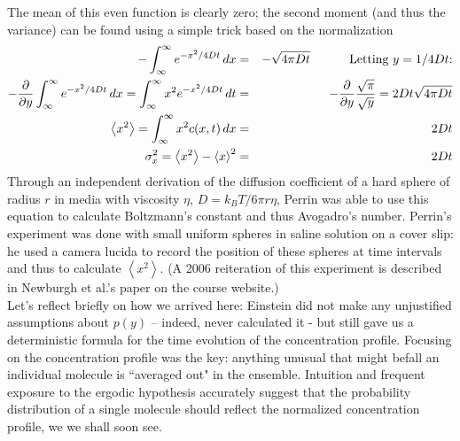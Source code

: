 \documentclass{article}
\begin{document}
The mean of this even function is clearly zero; the second moment (and thus the variance) can be found using a simple trick based on the normalization 
\begin{eqnarray*}
- \int_{\infty}^{\infty} e^{-x^2/4Dt} \, dx & = & - \sqrt{4\pi D t} \hspace{1 cm} \textrm{ Letting $y=1/4 D t$:}\\
- \frac{\partial}{\partial y} \int_{\infty}^{\infty} e^{-x^2/4Dt} \, dx =
\int_{\infty}^{\infty} x^2 e^{-x^2/4Dt} \, dt & = & - \frac{\partial}{\partial y} \frac{\sqrt{\pi}}{\sqrt{y}} = 2 D t \sqrt{4 \pi D t}\\
\left< x^2 \right> = \int_{\infty}^{\infty} x^2 c(x,t) \, dx  & = & 2 D t\\
\sigma_x^2 = \left< x^2 \right>  - \left< x \right>^2 & = & 2Dt
\end{eqnarray*}
Through an independent derivation of the diffusion coefficient of a hard sphere of radius $r$ in media with viscosity $\eta$, $D=k_B T / 6\pi r \eta$, Perrin was able to use this equation to calculate Boltzmann's constant and thus Avogadro's number. Perrin's experiment was done with small uniform spheres in saline solution on a cover slip: he used a camera lucida to record the position of these spheres at time intervals and thus to calculate $\left< x^2 \right>$. (A 2006 reiteration of this experiment is described in Newburgh et al.'s paper on the course website.)\\

Let's reflect briefly on how we arrived here: Einstein did not make any unjustified assumptions about $p(y)$ -- indeed, never calculated it - but still gave us a deterministic formula for the time evolution of the concentration profile. Focusing on the concentration profile was the key: anything unusual that might befall an individual molecule is ``averaged out" in the ensemble. Intuition and frequent exposure to the ergodic hypothesis accurately suggest that the probability distribution of a single molecule should reflect the normalized concentration profile, we we shall soon see.
\end{document}
